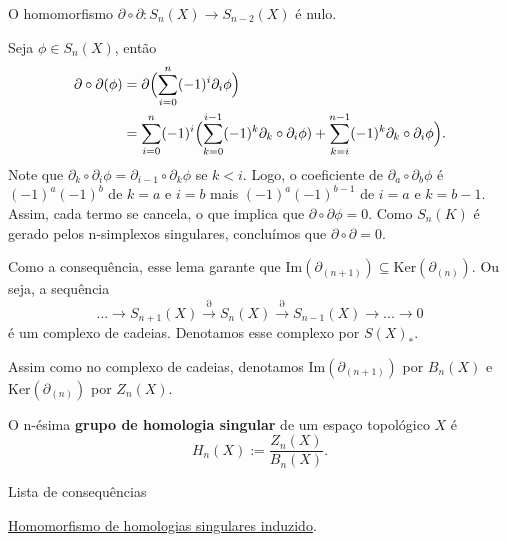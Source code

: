 \begin{lemma}
    O homomorfismo $\partial\circ \partial:S_n(X)\rightarrow S_{n-2}(X)$ é nulo.
\end{lemma}

\begin{dem}
    Seja $\phi\in S_n(X)$, então 
    \begin{align*}
        \partial\circ \partial(\phi)&=\partial\Bigl(\sum_{i=0}^n (-1)^i \partial_i\phi \Bigr) \\
        &=\sum_{i=0}^n (-1)^i  \Bigl( \sum_{k=0}^{i-1}(-1)^k \partial_k\circ\partial_i \phi)+\sum_{k=i}^{n-1} (-1)^k\partial_{k}\circ\partial_i \phi  \Bigr).
    \end{align*}
    Note que $\partial_k\circ\partial_i\phi=\partial_{i-1}\circ\partial_k \phi$ se $k<i$. Logo, o coeficiente de $\partial_a\circ\partial_b \phi$ é $(-1)^a(-1)^b$ de $k=a$ e $i=b$ mais $(-1)^a(-1)^{b-1}$ de $i=a$ e $k=b-1$. Assim, cada termo se cancela, o que implica que $\partial\circ\partial\phi=0$. Como $S_n(K)$ é gerado pelos n-simplexos singulares, concluímos que $\partial\circ\partial=0$.
\end{dem}

Como a consequência, esse lema garante que $\text{Im}(\partial_{(n+1)})\subseteq \text{Ker}(\partial_{(n)})$. Ou seja, a sequência 
\[...\rightarrow S_{n+1}(X)\xrightarrow{\partial}S_n(X)\xrightarrow{\partial} S_{n-1}(X)\rightarrow...\rightarrow 0\]
é um complexo de cadeias. Denotamos esse complexo por $S(X)_*$.

Assim como no complexo de cadeias, denotamos $\text{Im}(\partial_{(n+1)})$ por $B_n(X)$ e $\text{Ker}(\partial_{(n)})$ por $Z_n(X)$.

\begin{defi}
    O n-ésima \textbf{grupo de homologia singular} de um espaço topológico $X$ é 
    \[H_n(X):=\frac{Z_n(X)}{B_n(X)}.\]
\end{defi}

\begin{titlemize}{Lista de consequências}
    \item \hyperref[homomorfismo-de-homologias-singulares-induzido-prop]{Homomorfismo de homologias singulares induzido}.\\ %
\end{titlemize}
